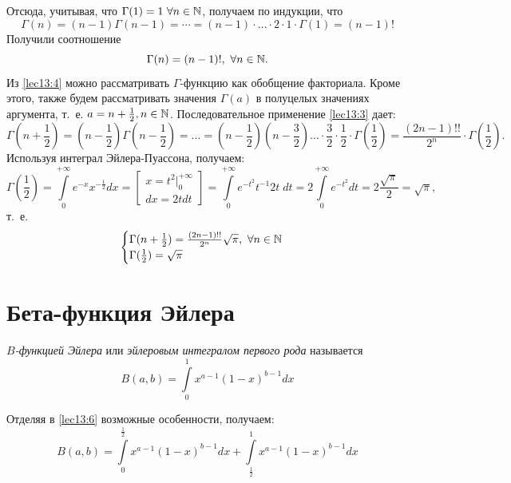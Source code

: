 \documentclass[../../main.tex]{subfiles}
\begin{document}
Отсюда, учитывая, что $\Gamma(1) = 1\ \forall n \in \N$, получаем по индукции, 
что
\[\Gamma(n) = (n-1)\Gamma(n-1) = \cdots = (n-1) \cdot \ldots \cdot 2 \cdot 1 
\cdot 
\Gamma(1) = (n-1)!\]
Получили соотношение
\begin{equation}
\label{lec13:4}
\Gamma(n) = (n-1)!,\ \forall n \in \mathbb{N}.
\end{equation}
Из \eqref{lec13:4} можно рассматривать $\Gamma$-функцию как обобщение 
факториала. Кроме этого, также будем рассматривать значения $\Gamma(a)$ в 
полуцелых значениях аргумента, т.~е. $a = {n + \frac{1}{2}}, {n \in \mathbb{N}}$.
Последовательное применение \eqref{lec13:3} дает:
\[
\Gamma\left(n + \frac{1}{2}\right) = \left(n - 
\frac{1}{2}\right)\Gamma\left(n-\frac{1}{2}\right)=\ldots=
\left(n-\frac{1}{2}\right)\left(n-\frac{3}{2}\right)\ldots\cdot \frac{3}{2} 
\cdot \frac{1}{2} \cdot \Gamma\left(\frac{1}{2}\right) 
= 
\frac{(2n-1)!!}{2^n}\cdot \Gamma\left(\frac{1}{2}\right).
\]
Используя интеграл Эйлера-Пуассона, получаем:
\[
\Gamma\left(\frac{1}{2}\right) = \int\limits_0^{+\infty} e^{-x} 
x^{-\frac{1}{2}} dx = \left[\begin{array}{l}
x = t^2|_0^{+\infty} \\ dx = 2tdt
\end{array}
\right] = 
\int\limits_0^{+\infty} e^{-t^2} t^{-1} 2t\; dt = 2 \int\limits_0^{+\infty} 
e^{-t^2} dt 
= 2 \frac{\sqrt{\pi}}{2} = \sqrt{\pi},
\]
т.~е.
\begin{equation}
	\label{lec13:5}
	\begin{cases}
		\Gamma(n+\frac{1}{2}) = \frac{(2n-1)!!}{2^n} \sqrt{\pi},\ \forall n \in \N \\
		\Gamma(\frac{1}{2}) = \sqrt{\pi}
	\end{cases}
\end{equation}

\section{Бета-функция Эйлера}
\emph{$B$-функцией Эйлера} или \emph{эйлеровым интегралом первого рода} 
называется
\begin{equation}
	\label{lec13:6}
	B(a, b) = \int\limits_0^1x^{a-1}(1-x)^{b-1}dx
\end{equation}

Отделяя в \eqref{lec13:6} возможные особенности, получаем:
\begin{equation}
	\label{lec13:7}
	B(a, b) = \int\limits_0^{\frac{1}{2}} 
	x^{a-1} (1-x)^{b-1}dx + \int\limits_{\frac{1}{2}}^{1} 
	x^{a-1}(1-x)^{b-1}dx
\end{equation}
\end{document}
